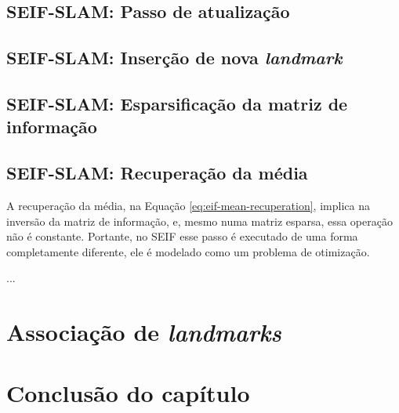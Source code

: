 \subsection{SEIF-SLAM: Passo de atualização}
\subsection{SEIF-SLAM: Inserção de nova \textit{landmark}}
\subsection{SEIF-SLAM: Esparsificação da matriz de informação}

\subsection{SEIF-SLAM: Recuperação da média}
A recuperação da média, na Equação \ref{eq:eif-mean-recuperation}, implica na 
inversão da matriz de informação, e, mesmo numa matriz esparsa, essa operação 
não é constante. Portante, no SEIF esse passo é executado de uma forma 
completamente diferente, ele é modelado como um problema de otimização.

...

\section{Associação de \textit{landmarks}}

\section{Conclusão do capítulo}